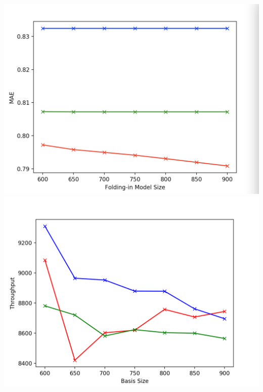 \documentclass[11pt]{article}
\begin{document}
\begin{enumerate}

\includegraphics[width=0.7\columnwidth]{q7_result1}\newline
\includegraphics[width=0.7\columnwidth]{q7_result3}

\end{enumerate}
\end{document}
